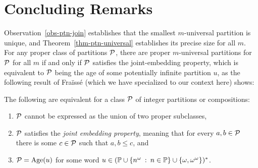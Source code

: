 \section{Concluding Remarks}
\label{sec-ptn-conclusion}

Observation~\ref{obs-ptn-join} establishes that the smallest $m$-universal partition is unique, and Theorem~\ref{thm-ptn-universal} establishes its precise size for all $m$. For any proper class of partitions $\P$, there are proper $m$-universal partitions for $\P$ for all $m$ if and only if $\P$ satisfies the joint-embedding property, which is equivalent to $\P$ being the age of some potentially infinite partition $u$, as the following result of Fra{\"i}ss{\'e} (which we have specialized to our context here) shows:
\begin{theorem} 
	The following are equivalent for a class $\P$ of integer partitions or compositions:
	\begin{enumerate}
		\item $\P$ cannot be expressed as the union of two proper subclasses,
		\item $\P$ satisfies the \emph{joint embedding property}, meaning that for every $a, b \in \P$ there is some $c \in \P$ such that $a, b \le c$, and 
		\item $\P = \Age(u)$ for some word $u \in (\mathbb{P} \cup \{n^\omega \st n \in \mathbb{P}\} \cup \{\omega, \omega^\omega\})^\ast$.
	\end{enumerate}
\end{theorem}

